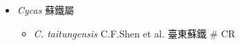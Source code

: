 
  \begin{itemize}
 \item[] \textit{Cycas} 蘇鐵屬
                            
  \begin{itemize}
        \item[] \textit{C. taitungensis} C.F.Shen et al.  臺東蘇鐵  \# CR
  \end{itemize}
  \end{itemize}
